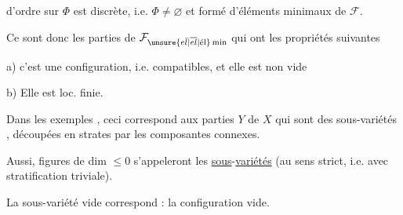 
d'ordre sur $\Phi$ est discrète, i.e. $\Phi\neq\varnothing$ et formé d'éléments minimaux de $\mathcal{F}$.

Ce sont donc les  parties de $\mathcal{F}_{\unsure{e\bar l|\overline{el}|\text{él}}\,\mathrm{min}}$ qui ont les propriétés suivantes

a) c'est une configuration, i.e.    compatibles, et elle est non vide

b) Elle est loc. finie.

Dans les exemples , ceci correspond aux parties  $Y$ de $X$ qui sont des sous-variétés , découpées en strates par les composantes connexes.

Aussi,  figures de dim $\leq 0$ s'appeleront les \uline{sous}-\uline{variétés} (au sens strict, i.e. avec stratification triviale).

La sous-variété vide correspond : la configuration vide.

